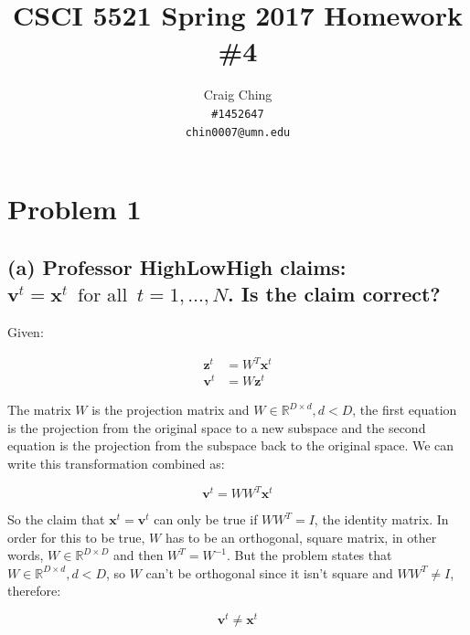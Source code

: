 \documentclass{article}
\author{Craig Ching\\
      \texttt{\#1452647} \\
      \texttt{chin0007@umn.edu}}
\title{
CSCI 5521 Spring 2017 Homework \#4}
\begin{document}
\maketitle

\newcommand{\mysum} {\sum\limits_{i = 1}^n}
\newcommand{\myz} {\mathbf{w}^T x_i}


\section{Problem 1}

\subsection{(a) Professor HighLowHigh claims: $\mathbf{v}^t = \mathbf{x}^t \enspace \text{for all} \enspace t = 1, \dots, N$.  Is the claim correct?}

Given:

\begin{equation}
\begin{aligned}
\mathbf{z}^t &= W^T\mathbf{x}^t \\
\mathbf{v}^t &= W\mathbf{z}^t
\end{aligned}
\end{equation}

The matrix $W$ is the projection matrix and $W \in \mathbb{R}^{D \times d}, d < D$, the first equation is the projection from the original space to a new subspace and the second equation is the projection from the subspace back to the original space.  We can write this transformation combined as:

\begin{equation}
\mathbf{v}^t = WW^T\mathbf{x}^t
\end{equation}

So the claim that $\mathbf{x}^t = \mathbf{v}^t$ can only be true if $WW^T = I$, the identity matrix.  In order for this to be true, $W$ has to be an orthogonal, square matrix, in other words, $W \in \mathbb{R}^{D \times D}$ and then $W^T = W^{-1}$.  But the problem states that $W \in \mathbb{R}^{D \times d}, d < D$, so $W$ can't be orthogonal since it isn't square and $WW^T \neq I$, therefore:

\begin{equation}
\mathbf{v}^t \neq \mathbf{x}^t
\end{equation}


\end{document}
